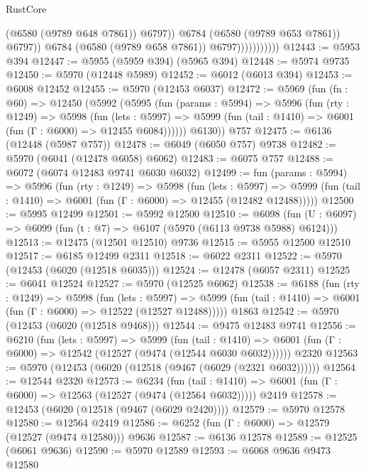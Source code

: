 \begin{lexlean}{RustCore}
\begin{coremodule}
                                  (@6580 (@9789 @648 @7861))
                                  @6797))
                              @6784
                              (@6580 (@9789 @653 @7861))
                              @6797))
                          @6784
                          (@6580 (@9789 @658 @7861))
                          @6797)))))))))))
@12443 := @5953 @394
@12447 := @5955 (@5959 @394) (@5965 @394)
@12448 := @5974 @9735
@12450 := @5970 (@12448 @5989)
@12452 := @6012 (@6013 @394)
@12453 := @6008 @12452
@12455 := @5970 (@12453 @6037)
@12472 := @5969
    (fun (fn : @60) =>
    @12450
      (@5992
        (@5995
          (fun (params : @5994) =>
          @5996
            (fun (rty : @1249) =>
            @5998
              (fun (lets : @5997) =>
              @5999 (fun (tail : @1410) => @6001 (fun (Γ : @6000) => @12455 @6084))))))
        @6130))
    @757
@12475 := @6136 (@12448 (@5987 @757))
@12478 := @6049 (@6050 @757) @9738
@12482 := @5970 (@6041 (@12478 @6058) @6062)
@12483 := @6075 @757
@12488 := @6072 (@6074 @12483 @9741 @6030 @6032)
@12499 := fun (params : @5994) =>
  @5996
    (fun (rty : @1249) =>
    @5998
      (fun (lets : @5997) =>
      @5999 (fun (tail : @1410) => @6001 (fun (Γ : @6000) => @12455 (@12482 @12488)))))
@12500 := @5995 @12499
@12501 := @5992 @12500
@12510 := @6098 (fun (U : @6097) => @6099 (fun (t : @7) => @6107 (@5970 (@6113 @9738 @5988) @6124)))
@12513 := @12475 (@12501 @12510) @9736
@12515 := @5955 @12500 @12510
@12517 := @6185 @12499 @2311
@12518 := @6022 @2311
@12522 := @5970 (@12453 (@6020 (@12518 @6035)))
@12524 := @12478 (@6057 @2311)
@12525 := @6041 @12524
@12527 := @5970 (@12525 @6062)
@12538 := @6188
    (fun (rty : @1249) =>
    @5998
      (fun (lets : @5997) =>
      @5999 (fun (tail : @1410) => @6001 (fun (Γ : @6000) => @12522 (@12527 @12488)))))
    @1863
@12542 := @5970 (@12453 (@6020 (@12518 @9468)))
@12544 := @9475 @12483 @9741
@12556 := @6210
    (fun (lets : @5997) =>
    @5999
      (fun (tail : @1410) =>
      @6001 (fun (Γ : @6000) => @12542 (@12527 (@9474 (@12544 @6030 @6032))))))
    @2320
@12563 := @5970 (@12453 (@6020 (@12518 (@9467 (@6029 (@2321 @6032))))))
@12564 := @12544 @2320
@12573 := @6234
    (fun (tail : @1410) => @6001 (fun (Γ : @6000) => @12563 (@12527 (@9474 (@12564 @6032)))))
    @2419
@12578 := @12453 (@6020 (@12518 (@9467 (@6029 @2420))))
@12579 := @5970 @12578
@12580 := @12564 @2419
@12586 := @6252 (fun (Γ : @6000) => @12579 (@12527 (@9474 @12580))) @9636
@12587 := @6136 @12578
@12589 := @12525 (@6061 @9636)
@12590 := @5970 @12589
@12593 := @6068 @9636 @9473 @12580

\end{coremodule}
\end{lexlean}
